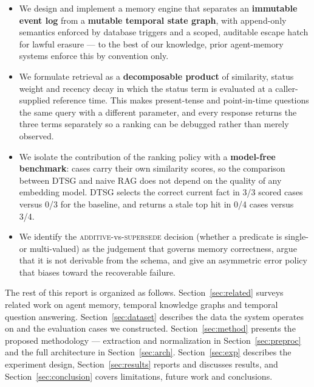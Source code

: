 \documentclass[11pt,a4paper]{article}
\begin{document}
\begin{itemize}
  \item We design and implement a memory engine that separates an
        \textbf{immutable event log} from a \textbf{mutable temporal state
        graph}, with append-only semantics enforced by database triggers and a
        scoped, auditable escape hatch for lawful erasure --- to the best of our
        knowledge, prior agent-memory systems enforce this by convention only.
  \item We formulate retrieval as a \textbf{decomposable product} of
        similarity, status weight and recency decay in which the status term is
        evaluated at a caller-supplied reference time. This makes present-tense
        and point-in-time questions the same query with a different parameter,
        and every response returns the three terms separately so a ranking can
        be debugged rather than merely observed.
  \item We isolate the contribution of the ranking policy with a
        \textbf{model-free benchmark}: cases carry their own similarity scores,
        so the comparison between DTSG and naive RAG does not depend on the
        quality of any embedding model. DTSG selects the correct current fact
        in 3/3 scored cases versus 0/3 for the baseline, and returns a stale top
        hit in 0/4 cases versus 3/4.
  \item We identify the \textsc{additive}-vs-\textsc{supersede} decision
        (whether a predicate is single- or multi-valued) as the judgement that
        governs memory correctness, argue that it is not derivable from the
        schema, and give an asymmetric error policy that biases toward the
        recoverable failure.
\end{itemize}

The rest of this report is organized as follows. Section~\ref{sec:related}
surveys related work on agent memory, temporal knowledge graphs and temporal
question answering. Section~\ref{sec:dataset} describes the data the system
operates on and the evaluation cases we constructed.
Section~\ref{sec:method} presents the proposed methodology --- extraction and
normalization in Section~\ref{sec:preproc} and the full architecture in
Section~\ref{sec:arch}. Section~\ref{sec:exp} describes the experiment design,
Section~\ref{sec:results} reports and discusses results, and
Section~\ref{sec:conclusion} covers limitations, future work and conclusions.

\end{document}
